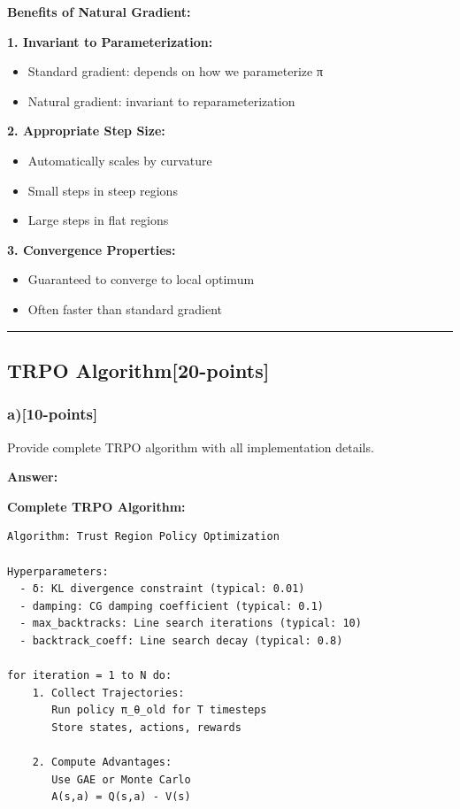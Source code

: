 \documentclass[12pt]{article}
\begin{document}
{{\textbf{Benefits of Natural Gradient:}

\textbf{1. Invariant to Parameterization:}
\begin{itemize}
\item Standard gradient: depends on how we parameterize π
\item Natural gradient: invariant to reparameterization
\end{itemize}

\textbf{2. Appropriate Step Size:}
\begin{itemize}
\item Automatically scales by curvature
\item Small steps in steep regions
\item Large steps in flat regions
\end{itemize}

\textbf{3. Convergence Properties:}
\begin{itemize}
\item Guaranteed to converge to local optimum
\item Often faster than standard gradient
\end{itemize}

\noindent\rule{\textwidth}{0.2pt}

\subsection{TRPO Algorithm[20-points]}
\subsubsection{a)[10-points]} Provide complete TRPO algorithm with all implementation details.

\textbf{Answer:}

\textbf{Complete TRPO Algorithm:}

\begin{verbatim}
Algorithm: Trust Region Policy Optimization

Hyperparameters:
  - δ: KL divergence constraint (typical: 0.01)
  - damping: CG damping coefficient (typical: 0.1)
  - max_backtracks: Line search iterations (typical: 10)
  - backtrack_coeff: Line search decay (typical: 0.8)

for iteration = 1 to N do:
    1. Collect Trajectories:
       Run policy π_θ_old for T timesteps
       Store states, actions, rewards

    2. Compute Advantages:
       Use GAE or Monte Carlo
       A(s,a) = Q(s,a) - V(s)


\end{verbatim}}}
\end{document}
